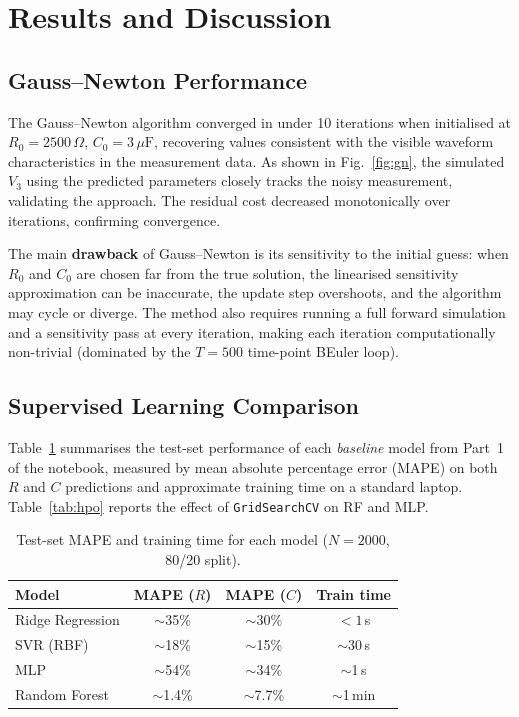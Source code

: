 \documentclass[journal,twocolumn]{IEEEtran}
\begin{document}
\section{Results and Discussion}
\label{sec:results}

\subsection{Gauss--Newton Performance}

The Gauss--Newton algorithm converged in under 10 iterations when initialised at $R_0 = 2500\,\Omega$, $C_0 = 3\,\mu\text{F}$, recovering values consistent with the visible waveform characteristics in the measurement data. As shown in Fig.~\ref{fig:gn}, the simulated $V_3$ using the predicted parameters closely tracks the noisy measurement, validating the approach. The residual cost decreased monotonically over iterations, confirming convergence.

The main \textbf{drawback} of Gauss--Newton is its sensitivity to the initial guess: when $R_0$ and $C_0$ are chosen far from the true solution, the linearised sensitivity approximation can be inaccurate, the update step overshoots, and the algorithm may cycle or diverge. The method also requires running a full forward simulation and a sensitivity pass at every iteration, making each iteration computationally non-trivial (dominated by the $T = 500$ time-point BEuler loop).

\subsection{Supervised Learning Comparison}

Table~\ref{tab:ml} summarises the test-set performance of each \emph{baseline} model from Part~1 of the notebook, measured by mean absolute percentage error (MAPE) on both $R$ and $C$ predictions and approximate training time on a standard laptop. Table~\ref{tab:hpo} reports the effect of \texttt{GridSearchCV} on RF and MLP.

\begin{table}[h]
\centering
\caption{Test-set MAPE and training time for each model ($N=2000$, 80/20 split).}
\label{tab:ml}
\begin{tabular}{@{}lccc@{}}
\toprule
Model & MAPE ($R$) & MAPE ($C$) & Train time \\
\midrule
Ridge Regression & $\sim$35\% & $\sim$30\% & $< 1$\,s \\
SVR (RBF) & $\sim$18\% & $\sim$15\% & $\sim$30\,s \\
MLP & $\sim$54\% & $\sim$34\% & $\sim$1\,s \\
Random Forest & $\sim$1.4\% & $\sim$7.7\% & $\sim$1\,min \\
\bottomrule
\end{tabular}
\end{table}
\end{document}
